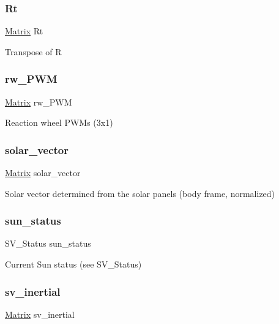 \subsubsection{\texorpdfstring{Rt}{Rt}}
{\footnotesize\ttfamily \mbox{\hyperlink{struct___matrix}{Matrix}} Rt}

Transpose of R \mbox{\label{struct_a_c_s_type_abadd729b1d9de2b8414c7949637aac27}} 
\subsubsection{\texorpdfstring{rw\_PWM}{rw\_PWM}}
{\footnotesize\ttfamily \mbox{\hyperlink{struct___matrix}{Matrix}} rw\+\_\+\+P\+WM}

Reaction wheel P\+W\+Ms (3x1) \mbox{\label{struct_a_c_s_type_a2565c37ca09278f1f6e2405328e94bc8}} 
\subsubsection{\texorpdfstring{solar\_vector}{solar\_vector}}
{\footnotesize\ttfamily \mbox{\hyperlink{struct___matrix}{Matrix}} solar\+\_\+vector}

Solar vector determined from the solar panels (body frame, normalized) \mbox{\label{struct_a_c_s_type_a08e060b8d3806d1da157f82ff6ef89c0}} 
\subsubsection{\texorpdfstring{sun\_status}{sun\_status}}
{\footnotesize\ttfamily S\+V\+\_\+\+Status sun\+\_\+status}

Current Sun status (see S\+V\+\_\+\+Status) \mbox{\label{struct_a_c_s_type_af56596ec9fe0cf9632dd40932883191e}} 
\subsubsection{\texorpdfstring{sv\_inertial}{sv\_inertial}}
{\footnotesize\ttfamily \mbox{\hyperlink{struct___matrix}{Matrix}} sv\+\_\+inertial}

